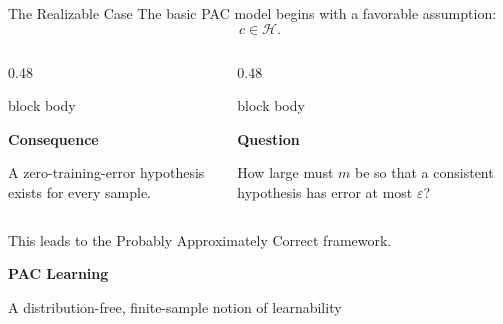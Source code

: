 \documentclass[aspectratio=169,10pt]{beamer}
\newcommand{\Hc}{\mathcal{H}}
\newcommand{\eps}{\varepsilon}
\newcommand{\SectionSlide}[2]{%
  \begin{frame}
    \centering
    \vfill
    {\color{slideorange}\fontsize{29}{34}\selectfont\bfseries #1\par}
    \vspace{0.38cm}
    {\color{midgray}\fontsize{16}{21}\selectfont #2\par}
    \vfill
  \end{frame}
}
\begin{document}
\begin{frame}[t]{The Realizable Case}
  \vspace{0.24cm}
  {\fontsize{16}{20}\selectfont
  The basic PAC model begins with a favorable assumption:
  \[
    c\in\Hc.
  \]}
  \vspace{0.08cm}
  \begin{columns}[T,totalwidth=\textwidth]
    \begin{column}{0.48\textwidth}
      \begin{beamercolorbox}[rounded=true,sep=0.28cm,wd=\linewidth]{block body}
        {\normalsize \textbf{Consequence}\par
        A zero-training-error hypothesis exists for every sample.}
      \end{beamercolorbox}
    \end{column}
    \begin{column}{0.48\textwidth}
      \begin{beamercolorbox}[rounded=true,sep=0.28cm,wd=\linewidth]{block body}
        {\normalsize \textbf{Question}\par
        How large must $m$ be so that a consistent hypothesis has error at most $\eps$?}
      \end{beamercolorbox}
    \end{column}
  \end{columns}
  \vspace{0.40cm}
  \centering
  {\normalsize This leads to the Probably Approximately Correct framework.}
\end{frame}

\SectionSlide{PAC Learning}{A distribution-free, finite-sample notion of learnability}
\end{document}
